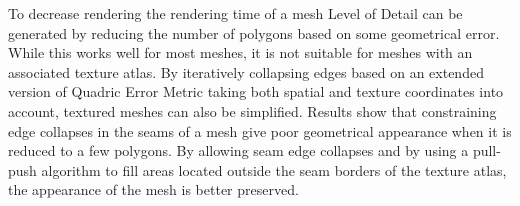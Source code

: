 
To decrease rendering the rendering time of a mesh Level of Detail can be generated by reducing the number of polygons based on some geometrical error. While this works well for most meshes, it is not suitable for meshes with an associated texture atlas. By iteratively collapsing edges based on an extended version of Quadric Error Metric taking both spatial and texture coordinates into account, textured meshes can also be simplified.
%
Results show that constraining edge collapses in the seams of a mesh give poor geometrical appearance when it is reduced to a few polygons. By allowing seam edge collapses and by using a pull-push algorithm to fill areas located outside the seam borders of the texture atlas, the appearance of the mesh is better preserved.



